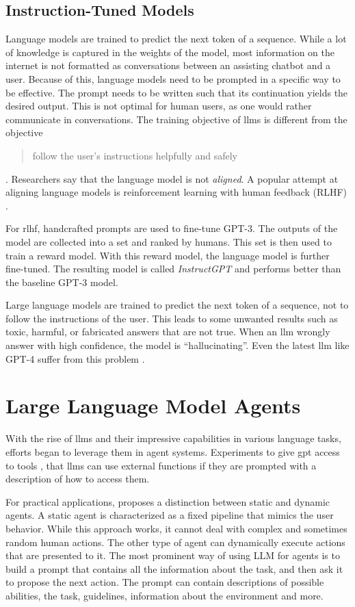 \documentclass[../main.tex]{subfiles}
\begin{document}
\subsection{Instruction-Tuned Models}

Language models are trained to predict the next token of a sequence.
While a lot of knowledge is captured in the weights of the model,
most information on the internet is not formatted as conversations
between an assisting chatbot and a user.
Because of this, language models need to be prompted in a specific way to be effective.
The prompt needs to be written such that its continuation yields the desired output.
This is not optimal for human users, as one would rather communicate in conversations.
The training objective of \glspl{llm} is different from the objective
\blockquote{follow the user's instructions helpfully and safely} \cite{Ouyang2022}.
Researchers say that the language model is not \emph{aligned}.
A popular attempt at aligning language models is reinforcement learning with human feedback (RLHF) \cite{Ouyang2022}.

For \gls{rlhf}, handcrafted prompts are used to fine-tune GPT-3.
The outputs of the model are collected into a set and ranked by humans.
This set is then used to train a reward model.
With this reward model, the language model is further fine-tuned.
The resulting model is called \emph{InstructGPT} and performs better than the baseline GPT-3 model.

Large language models are trained to predict the next token of a sequence,
not to follow the instructions of the user.
This leads to some unwanted results such as toxic, harmful, or fabricated answers that are not true.
When an \gls{llm} wrongly answer with high confidence, the model is ``hallucinating''.
Even the latest \gls{llm} like GPT-4 suffer from this problem \cite{OpenAI2024}.

\section{Large Language Model Agents}
\label{sec:llm_agents}

With the rise of \glspl{llm} and their impressive capabilities in various language tasks,
efforts began to leverage them in agent systems.
Experiments to give \gls{gpt} access to tools \autocite{Shen2023, Schick2023},
that \glspl{llm} can use external functions
if they are prompted with a description of how to access them.

For practical applications, \autocite{Zhu2024} proposes a distinction between static and dynamic agents.
A static agent is characterized as a fixed pipeline that mimics the user behavior.
While this approach works,
it cannot deal with complex and sometimes random human actions.
The other type of agent can dynamically execute actions that are presented to it.
The most prominent way of using LLM for agents
is to build a prompt that contains all the information about the task,
and then ask it to propose the next action.
The prompt can contain descriptions of possible abilities, the task, guidelines,
information about the environment and more.
\end{document}
